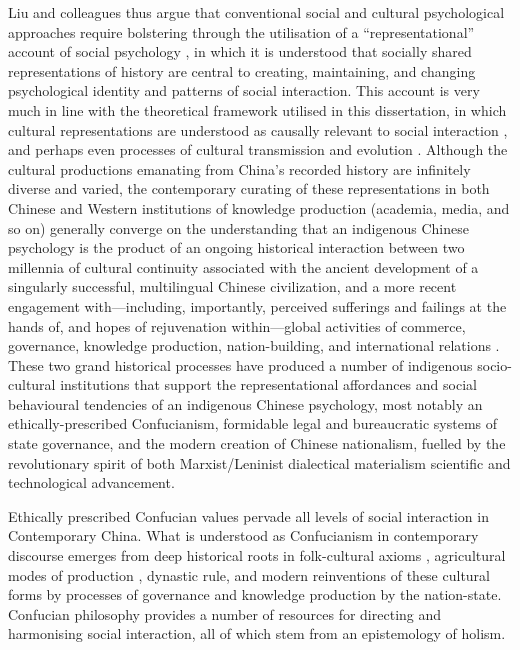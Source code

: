 {%
Liu and colleagues thus argue that conventional social and cultural psychological approaches require bolstering through the utilisation of a ``representational'' account of social psychology \citep{Liu2005}, in which it is understood that socially shared representations of history are central to creating, maintaining, and changing psychological identity and patterns of social interaction.  This account is very much in line with the theoretical framework utilised in this dissertation, in which cultural representations are understood as causally relevant to social interaction \citep{Vesper2017}, and perhaps even processes of cultural transmission and evolution \citep{Claidiere2014}.  Although the cultural productions emanating from China's recorded history are infinitely diverse and varied, the contemporary curating of these representations in both Chinese and Western institutions of knowledge production (academia, media, and so on) generally converge on the understanding that an indigenous Chinese psychology is the product of an ongoing historical interaction between two millennia of cultural continuity associated with the ancient development of a singularly successful, multilingual Chinese civilization, and a more recent engagement with---including, importantly, perceived sufferings and failings at the hands of, and hopes of rejuvenation within---global activities of commerce, governance, knowledge production, nation-building, and international relations \citep{Liu2009,Barme2009}.  These two grand historical processes have produced a number of indigenous socio-cultural institutions that support the representational affordances and social behavioural tendencies of an indigenous Chinese psychology, most notably an ethically-prescribed Confucianism, formidable legal and bureaucratic systems of state governance, and the modern creation of Chinese nationalism, fuelled by the revolutionary spirit of both Marxist/Leninist dialectical materialism scientific and technological advancement.

Ethically prescribed Confucian values pervade all levels of social interaction in Contemporary China. What is understood as Confucianism in contemporary discourse emerges from deep historical roots in folk-cultural axioms \citep{Wang2009}, agricultural modes of production \citep{Talhelm2014,Fei1992}, dynastic rule, and modern reinventions of these cultural forms by processes of governance and knowledge production by the nation-state\citep{Hwang1999,Liu2014}.  Confucian philosophy provides a number of resources for directing and harmonising social interaction, all of which stem from an epistemology of holism.


}
